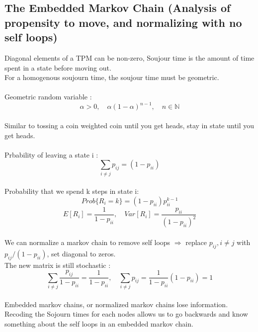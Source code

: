 \documentclass{article}
\begin{document}
	\subsection{The Embedded Markov Chain (Analysis of propensity to move, and normalizing with no self loops)}
	Diagonal elements of a TPM can be non-zero, Soujour time is the amount of time spent in a state before moving out. 
	\\For a homogenous soujourn time, the soujour time must be geometric.
	\\
	\\Geometric random variable : 
	\[ \alpha > 0,\quad \alpha(1-\alpha) ^ { n -1 }, \quad n \in \mathbb{N} \]
	\\Similar to tossing a coin weighted coin until you get heads, stay in state until you get heads.
	\\
	\\Prbability of leaving a state i :
	\[ \sum\limits_{i\neq j}{ p_{ij}} = (1 - p_{ii}) \]
	\\Probability that we spend k steps in state i:
	\[ Prob\{R_i=k\} = (1 - p_{ii})p_{ii}^{k-1}\]
	\[ E[R_i] = \frac{1}{1-p_{ii}}, \quad Var[R_i] =\frac{p_{ii}}{(1-p_{ii})^2} \]
	\\We can normalize a markov chain to remove self loops $\Longrightarrow$ replace $p_{ij}, i \neq j$ with $p_{ij} / (1 - p_{ii} )$, set diagonal to zeros.
	\\The new matrix is still stochastic :
	\[\sum\limits_{i\neq j}{\frac{p_{ij}}{1 - p_{ii}}} = \frac{1}{1-p_{ii}}, \quad\sum\limits_{i\neq j}{p_{ij}} =\frac{1}{1-p_{ii}} ( 1-p_{ii} )= 1\]
	\\Embedded markov chains, or normalized markov chains lose information.  Recoding the Sojourn times for each nodes allows us to go backwards and know
	something about the self loops in an embedded markov chain. 
\end{document}
